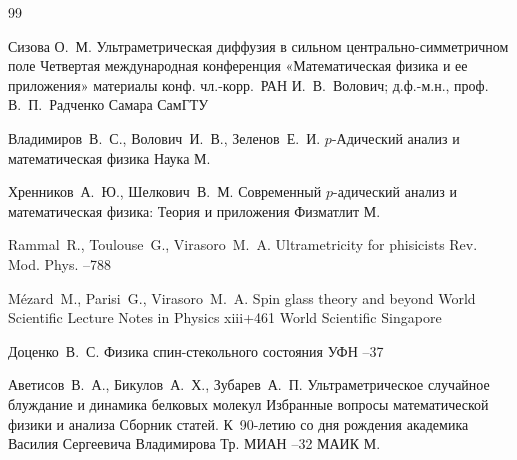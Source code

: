 \begin{thebibliography}{99}

\by Сизова О.~М.
\paper Ультраметрическая диффузия в сильном центрально-симметричном поле 
\inbook Четвертая международная конференция «Математическая физика и ее приложения»
\bookinfo материалы конф. 
\eds чл.-корр.~РАН И.~В.~Волович; д.ф.-м.н., проф. В.~П.~Радченко
\publaddr Самара
\publ СамГТУ


\by Владимиров~В.~С., Волович~И.~В., Зеленов~Е.~И.
\book $p$-Адический анализ и математическая физика
\publ Наука
\publaddr М.

\by Хренников~А.~Ю., Шелкович~В.~М.
\book Современный $p$-адический анализ и математическая физика: Теория и приложения
\publ Физматлит
\publaddr М.



\by Rammal~R., Toulouse~G., Virasoro~M.~A.
\paper Ultrametricity for phisicists
\jour Rev. Mod. Phys.
--788

\by M\'ezard~M., Parisi~G., Virasoro~M.~A.
\book Spin glass theory and beyond
\serial World Scientific Lecture Notes in Physics
\totalpages xiii+461 
\publ World Scientific
\publaddr Singapore

\by Доценко~В.~С.
\paper Физика спин-стекольного состояния
\jour УФН
--37

\by Аветисов~В.~А., Бикулов~А.~Х., Зубарев~А.~П.
\paper Ультраметрическое случайное блуждание и динамика белковых молекул
\inbook Избранные вопросы математической физики и анализа
\bookinfo Сборник статей. К~90-летию со дня рождения академика Василия Сергеевича Владимирова
\serial Тр. МИАН
--32
\publ МАИК
\publaddr М.



\end{thebibliography}
